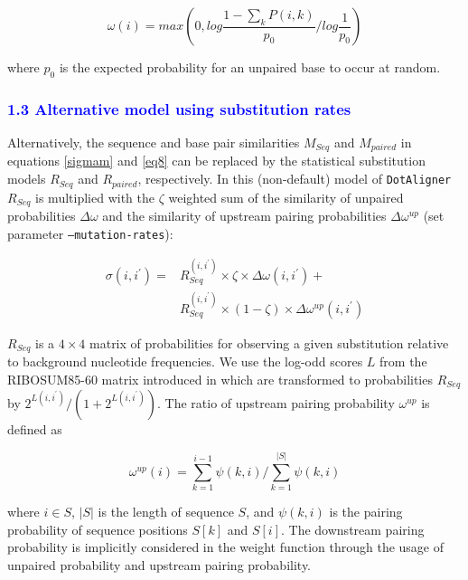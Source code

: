 \documentclass{bmcart}
\newcommand\dotaligner{\texttt{DotAligner}}
\begin{document}
\begin{equation}\label{eq12}
	\omega(i) = max \left( 0, log \frac{1 - \sum_k P(i,k)}{p_0} / log \frac{1}{p_0} \right)
\end{equation}

\noindent  where $p_0$ is the expected probability for an unpaired base to occur at
random.

\textcolor{blue}{
\subsubsection*{1.3 Alternative model using substitution rates}
}

Alternatively, the sequence and base pair similarities $M_{Seq}$ and $M_{paired}$ in equations \ref{sigmam} and \ref{eq8} can be replaced by the statistical substitution models $R_{Seq}$ and $R_{paired}$, respectively. In this (non-default) model of \dotaligner{} $R_{Seq}$ is multiplied with the $\zeta$
weighted sum of the similarity of unpaired probabilities $\Delta \omega$ and the similarity of upstream
pairing probabilities $\Delta \omega^{up}$ (set parameter \texttt{--mutation-rates}):

\begin{equation}\label{sigmar}
\begin{aligned}
	\sigma(i,i^\prime) ={} & R_{Seq}^{(i,i^\prime)} \times \zeta \times \Delta \omega(i,i^\prime) +  \\
			       & R_{Seq}^{(i,i^\prime)} \times (1-\zeta) \times
	\Delta \omega^{up}(i,i^\prime)
\end{aligned}
\end{equation}

\noindent  $R_{Seq}$ is a $4\times4$ matrix of probabilities for observing
a given substitution relative to background nucleotide frequencies. We use the
log-odd scores $L$ from the RIBOSUM85-60 matrix introduced in
\cite{Klein14499004} which are transformed to probabilities $R_{Seq}$ by
$2^{L(i,i^\prime)} / (1 + 2^{L(i,i^\prime)})$. The ratio of upstream pairing probability
$\omega^{up}$ is defined as

\begin{equation}\label{eq5}
	\omega^{up}(i) = \sum_{k=1}^{i-1} \psi(k,i) /
	\sum_{k=1}^{|S|} \psi(k,i)
\end{equation}

\noindent where $i \in S$, $|S|$ is the length of sequence $S$, and $\psi(k,i)$ is the
pairing probability of sequence positions $S[k]$ and $S[i]$. The downstream
pairing probability is implicitly considered in the weight function through the
usage of unpaired probability and upstream pairing probability.
\end{document}
